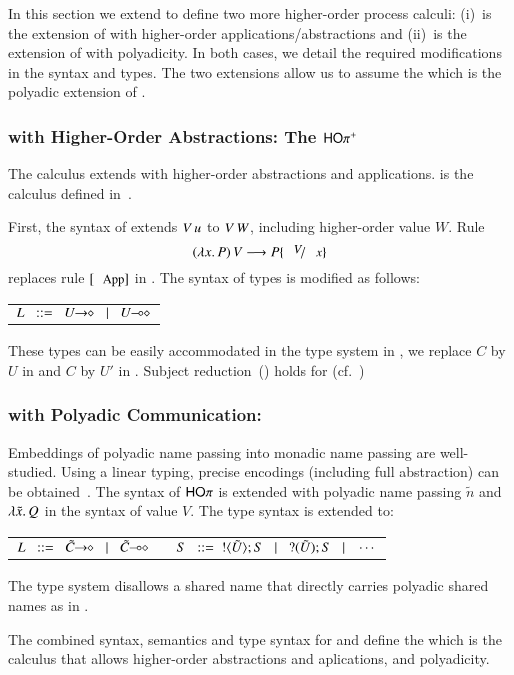 



In this section we extend \HOp to define two more higher-order
process calculi:
(i)~\HOpp is the extension of \HOp with higher-order applications/abstractions
and 
(ii)~\PHOp is the extension of \HOp
with polyadicity.
In both cases, we detail the
required modifications in the syntax and types.
The two extensions allow us to assume the \PHOpp
which is the polyadic extension of \HOpp.


\subsubsection{\HOp with Higher-Order Abstractions: The  $\mathsf{HO\pi^{+}}$}
\noi 
The calculus \HOpp 
extends \HOp with higher-order abstractions and applications.
\HOpp is the calculus defined in~\cite{characteristic_bis}.

\noi First, the syntax of  extends 
$V\, {u}$ to $V\, {W}$, including higher-order value $W$. 
Rule 
\[
	\appl{(\abs{x}{P})}{V} \red P \subst{V}{x}
\]
replaces rule $\orule{App}$ in .
The syntax of types is modified as follows: %
%
\begin{center}
	\begin{tabular}{c}
		$L \bnfis \shot{U} \bnfbar \lhot{U}$
	\end{tabular}
\end{center}
These types can be easily accommodated in the type system in , 
we replace $C$ by $U$ in  and $C$ by $U'$ in . Subject
reduction~() holds for \HOpp (cf.~\cite{characteristic_bis})

\subsubsection{\HOp with Polyadic Communication: \PHOp}

\noi Embeddings of polyadic name passing into monadic name passing are
well-studied. %
Using a linear typing, precise
encodings (including full abstraction) can be obtained~\cite{Yoshida96}.
The syntax of 
$\mathsf{HO}\pi$ is extended with
polyadic name passing $\tilde{n}$ and $\lambda \tilde{x}.\,Q$ in the syntax 
of value $V$. The type syntax is extended to: 
%
\begin{center}
	\begin{tabular}{c}
	$	L \bnfis \shot{\tilde{C}} \bnfbar \lhot{\tilde{C}}
		\quad\quad
		S \bnfis  \btout{\tilde{U}} S \bnfbar \btinp{\tilde{U}} S \bnfbar \cdots$
	\end{tabular}
\end{center}
%
The type system disallows a shared name that directly carries polyadic
shared names as in \cite{tlca07,MostrousY15}.

The combined syntax, semantics and type syntax for \HOpp and \PHOp
define the \PHOpp which is the calculus that allows higher-order
abstractions and aplications, and polyadicity.
